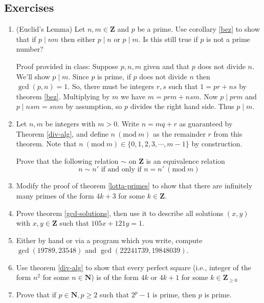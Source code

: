 \documentclass[12pt]{article}
\numberwithin{equation}{subsection}
\theoremstyle{note}
\newcommand{\Mod}[1]{\ (\mathrm{mod}\ #1)}
\begin{document}
\subsection{Exercises} \label{nt-ex}
\begin{enumerate}[label=\arabic*.]
	\item (Euclid's Lemma)\label{Euclid-lemma} Let $n,m\in \mathbf{Z}$ and $p$ be a prime. Use corollary \ref{bez} to show that if $p\mid nm$ then either $p\mid n$ or $p\mid m$. Is this still true if $p$ is not a prime number? 
	
		{\color{violet} Proof provided in class: Suppose $p,n,m$ given and that $p$ does not divide $n$. We'll show $p\mid m$. Since $p$ is prime, if $p$ does not divide $n$ then $\gcd(p,n)=1$. So, there must be integers $r,s$ such that $1=pr+ns$ by theorem \ref{bez}. Multiplying by $m$ we have $m=prm+nsm$. Now $p\mid prm$ and $p\mid nsm=snm$ by assumption, so $p$ divides the right hand side. Thus $p\mid m$.}
	
	\item \label{mod-n} Let $n,m$ be integers with $m>0$. Write $n=mq+r$ as guaranteed by Theorem \ref{div-alg}, and define $n\Mod{m}$ as the remainder $r$ from this theorem. Note that $n\Mod{m} \in \{0,1,2,3,\cdots, m-1\}$ by construction. 
	
	Prove  that the following relation $\sim$ on $\mathbf{Z}$ is an equivalence relation \[n\sim n' \text{ if and only if } n=n'\Mod{m}\]
	
	\item Modify the proof of theorem \ref{lotta-primes} to show that there are infinitely many primes of the form $4k+3$ for some $k\in\mathbf{Z}$.
	
	\item Prove theorem \ref{gcd-solutions}, then use it to describe all solutions $(x,y)$ with $x,y\in\mathbf{Z}$ such that $105x+121y=1$. 
	
	\item Either by hand or via a program which you write, compute $\gcd(19789, 23548)$ and $\gcd(22241739, 19848039)$.
	
	\item Use theorem \ref{div-alg} to show that every perfect square (i.e., integer of the form $n^2$ for some $n\in\mathbf{N}$) is of the form $4k$ or $4k+1$ for some $k\in\mathbf{Z}_{\geq 0}$
	
	\item Prove that if $p\in \mathbf{N}, p\geq 2$ such that $2^{p}-1$ is prime, then $p$ is prime. 
	

\end{enumerate}
\end{document}
